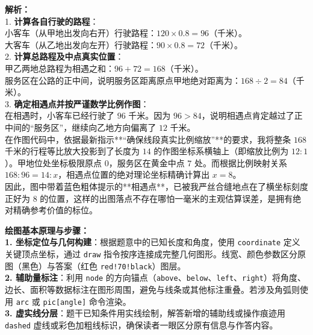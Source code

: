 \documentclass[12pt, a4paper]{ctexrep}
\begin{document}
\vspace{0.6cm}
{\small\color{gray}
\textbf{解析：}\\
1. \textbf{计算各自行驶的路程}：\\
\indent 小客车（从甲地出发向右开）行驶路程：$120 \times 0.8 = 96$（千米）。\\
\indent 大客车（从乙地出发向左开）行驶路程：$90 \times 0.8 = 72$（千米）。\\
2. \textbf{计算总路程及中点真实位置}：\\
\indent 甲乙两地总路程为相遇之和：$96 + 72 = 168$（千米）。\\
\indent 服务区在公路的正中间，说明服务区距离原点甲地绝对距离为：$168 \div 2 = 84$（千米）。\\
3. \textbf{确定相遇点并按严谨数学比例作图}：\\
\indent 在相遇时，小客车已经行驶了 $96$ 千米。因为 $96 > 84$，说明相遇点肯定越过了正中间的“服务区”，继续向乙地方向偏离了 $12$ 千米。\\
\indent 在作图代码中，依据最新指示**“确保线段真实比例缩放”**的要求，我将整条 $168$ 千米的行程等比放大投影到了长度为 $14$ 的作图坐标系横轴上（即缩放比例为 $12:1$）。甲地位处坐标极限原点 $0$，服务区在黄金中点 $7$ 处。而根据比例映射关系 $168 : 96 = 14 : x$，相遇点位置的绝对理论坐标精确计算出 $x = 8$。\\
\indent 因此，图中带着蓝色粗体提示的**相遇点**，已被我严丝合缝地点在了横坐标刻度正好为 $8$ 的位置，这样的出图落点不存在哪怕一毫米的主观估算误差，是拥有绝对精确参考价值的标位。
}


\vspace{0.6cm}

{\small\color{blue!70!black}
\textbf{绘图基本原理与步骤：}\\
\textbf{1. 坐标定位与几何构建}：根据题意中的已知长度和角度，使用 \texttt{coordinate} 定义关键顶点坐标，通过 \texttt{draw} 指令按序连接成完整几何图形。线宽、颜色参数区分原图（黑色）与答案（红色 \texttt{red!70!black}）图层。\\
\textbf{2. 辅助量标注}：利用 \texttt{node} 的方向锚点（\texttt{above}、\texttt{below}、\texttt{left}、\texttt{right}）将角度、边长、面积等数据标注在图形周围，避免与线条或其他标注重叠。若涉及角弧则使用 \texttt{arc} 或 \texttt{pic[angle]} 命令渲染。\\
\textbf{3. 虚实线分层}：题干已知条件用实线绘制，解答新增的辅助线或操作痕迹用 \texttt{dashed} 虚线或彩色加粗线标识，确保读者一眼区分原有信息与作答内容。
}


\end{document}
